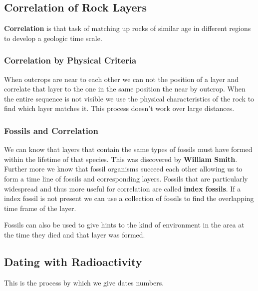 \documentclass{article}
\begin{document}

\subsection{Correlation of Rock Layers} %
\label{sub:correlation_of_rock_layers}
\textbf{Correlation} is that task of matching up rocks of similar age in different regions to develop a geologic time scale.

\subsubsection{Correlation by Physical Criteria} %
\label{sub:correlation_by_physical_criteria}
When outcrops are near to each other we can not the position of a layer and correlate that layer to the one in the same position the near by outcrop. When the entire sequence is not visible we use the physical characteristics of the rock to find which layer matches it. This process doesn't work over large distances.

\subsubsection{Fossils and Correlation} %
\label{sub:fossils_and_correlation}
We can know that layers that contain the same types of fossils must have formed within the lifetime of that species. This was discovered by \textbf{William Smith}. Further more we know that fossil organisms succeed each other allowing us to form a time line of fossils and corresponding layers. Fossils that are particularly widespread and thus more useful for correlation are called \textbf{index fossils}. If a index fossil is not present we can use a collection of fossils to find the overlapping time frame of the layer.

Fossils can also be used to give hints to the kind of environment in the area at the time they died and that layer was formed.



\subsection{Dating with Radioactivity} %
\label{sub:dating_with_radioactivity}
This is the process by which we give dates numbers.
\end{document}
